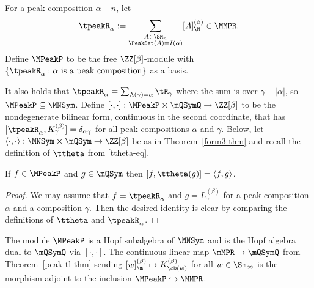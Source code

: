 \begin{definition}
For a peak composition $\alpha \vDash n$,
let
\[\tpeakR_\alpha := \sum_{\substack{A \in \SM_n \\  \PeakSet(A) =I(\alpha)}} [A]^{(\beta)}_\M  \in \MMPR.
\]
Define $\MPeakP$ to be the free $\ZZ[\beta]$-module 
with $\left\{\tpeakR_\alpha : \alpha\text{ is a peak composition}\right\}$ as a basis.
\end{definition}

 

It also holds that $\tpeakR_\alpha =  \sum_{\Lambda(\gamma) =\alpha} \tR_\gamma$
where the sum is over $\gamma \vDash |\alpha|$, so $\MPeakP\subseteq\MNSym$.
Define
$ [\cdot,\cdot ] : \MPeakP \times \mQSymQ \to \ZZ[\beta] $
to be the nondegenerate bilinear form, continuous in the second coordinate, that has 
$[ \tpeakR_\alpha, K^{(\beta)}_\gamma] = \delta_{\alpha\gamma}$
for all peak compositions $\alpha$ and $\gamma$.
Below, let $\langle \cdot,\cdot\rangle : \MNSym \times \mQSym \to \ZZ[\beta]$
be as in Theorem~\ref{form3-thm} 
and recall the definition of $\ttheta $ from \eqref{ttheta-eq}.


 

\begin{lemma}\label{[]-lem}
If $f \in \MPeakP$ and $g \in \mQSym$
then $\left[ f, \ttheta(g)\right] = \langle f,g\rangle$. 
\end{lemma}

\begin{proof}
We may assume that $f = \tpeakR_\alpha$ and $g = L^{(\beta)}_\gamma$
 for a peak composition $\alpha$ and a composition $\gamma$. 
Then the desired identity is clear by comparing the definitions of $\ttheta$ and $\tpeakR_\alpha$.
\end{proof}


\begin{theorem}\label{mpeakp-thm}
The module $\MPeakP$ is a Hopf subalgebra of $\MNSym$
and is the Hopf algebra dual to $\mQSymQ$ via   $[\cdot,\cdot]$.
The continuous linear map 
$\mMPR \to \mQSymQ$ 
from Theorem~\ref{peak-tl-thm}
sending
$[w]^{(\beta)}_\m \mapsto K^{(\beta)}_{\cD(w)}$  for all $w \in \Sm_\infty$
is the morphism adjoint to 
the inclusion
$\MPeakP \hookrightarrow \MMPR$.
\end{theorem}


